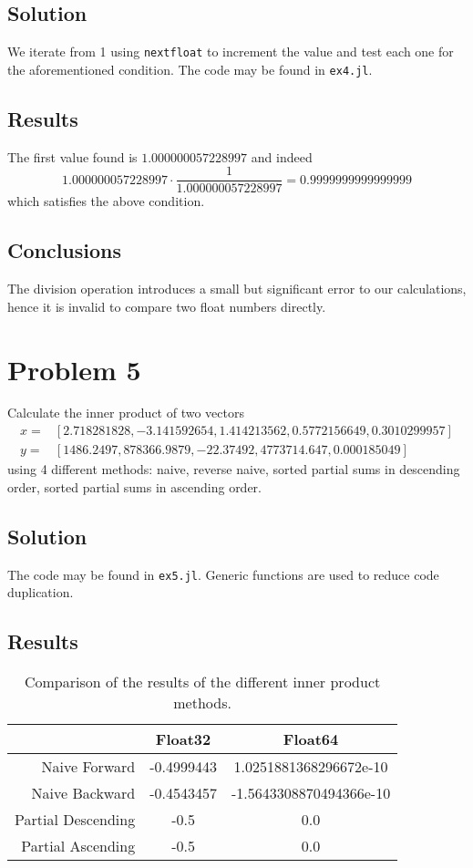 \documentclass[12pt, a4paper]{article}
\newcommand{\code}[1]{\texttt{#1}}
\begin{document}
\subsection{Solution}
We iterate from 1 using \code{nextfloat} to increment the value and test each
one for the aforementioned condition. The code may be found in \code{ex4.jl}.

\subsection{Results}
The first value found is $1.000000057228997$ and indeed
$$
1.000000057228997 \cdot \frac{1}{1.000000057228997} = 0.9999999999999999
$$
which satisfies the above condition.

\subsection{Conclusions}
The division operation introduces a small but significant error to our
calculations, hence it is invalid to compare two float numbers directly.

\section{Problem 5}
Calculate the inner product of two vectors
\begin{align*}
  x =& [2.718281828, -3.141592654, 1.414213562, 0.5772156649, 0.3010299957] \\
  y =& [1486.2497, 878366.9879, -22.37492, 4773714.647, 0.000185049]
\end{align*}
using 4 different methods: naive, reverse naive, sorted partial sums in
descending order, sorted partial sums in ascending order.

\subsection{Solution}
The code may be found in \code{ex5.jl}. Generic functions are used to reduce
code duplication.

\subsection{Results}
\begin{table}[h]
\centering
\begin{tabular}{@{}rcc@{}}
\toprule
                   & Float32    & Float64                 \\ \midrule Naive
Forward      & -0.4999443 & 1.0251881368296672e-10  \\ \midrule Naive Backward
& -0.4543457 & -1.5643308870494366e-10 \\ \midrule Partial Descending & -0.5
& 0.0                     \\ \midrule Partial Ascending  & -0.5       & 0.0
\\ \bottomrule
\end{tabular}
\caption{Comparison of the results of the different inner product methods.}
\label{tab:inner_products}
\end{table}
\end{document}
